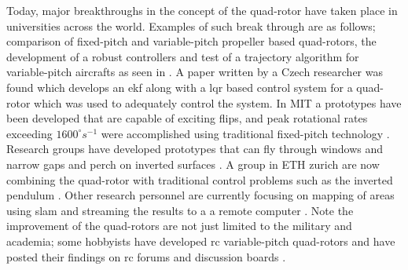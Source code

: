 Today, major breakthroughs in the concept of the quad-rotor have taken place in universities across the world. Examples of such break through are as follows; comparison of fixed-pitch and variable-pitch propeller based quad-rotors,  the development of  a robust controllers and test of a trajectory algorithm for variable-pitch aircrafts as seen in \cite{Variable_Pitch_Quadrotor_MIT, comparison_of_fixed_and_variable_pitch_actuators}. A paper written by a Czech researcher was found which develops an \gls{ekf} along with a \gls{lqr} based control system for a quad-rotor which was used to adequately control the system\cite{identification_and_Control_of_a_Quadrotor_(czech)}. In MIT a prototypes have been  developed  that are capable of exciting flips, and peak rotational rates exceeding $1600^{\circ}s^{-1}$ were accomplished using traditional fixed-pitch technology \cite{high_speed_quadrocopter_multi_flips}. Research groups have developed prototypes that can fly through windows and narrow gaps and perch on inverted surfaces \cite{Quad_fly_through_windows}. A group in ETH zurich are now combining the quad-rotor with traditional control problems such as the inverted pendulum \cite{flying_inverted_pendulum}. Other research personnel are currently focusing on mapping of areas using \gls{slam} and streaming the results to a a remote computer \cite{mapping_quad}. Note the improvement of the quad-rotors are not just limited to the military and academia; some hobbyists have developed \gls{rc} variable-pitch quad-rotors and have posted their findings on \gls{rc} forums and discussion boards \cite{misc_video}.

\begin{comment}
\section{Project Goals}
A benefit of doing a project in this area is the vast amount of information available about the subject of autonomous flight and the control/simulation of quad-rotors. 
The primary goal was to obtain a deeper understanding of control techniques, how one would implement them on a chip and improve programming skills in the process. The group's objective, was to control the quad-rotor in the hovering position in a certain location by using the supplied digital sensors \cite{accelerometer_datasheet,compass_datasheet,gyroscope_datasheet,rangefinder_datasheet,GPS_datasheet} and implement obstacle avoidance if possible. The main target was to obtain a complete and realistic control system for the quad-rotor with complete documentation so that the quad-rotor can be utilized in future projects/studies. 
\end{comment}


